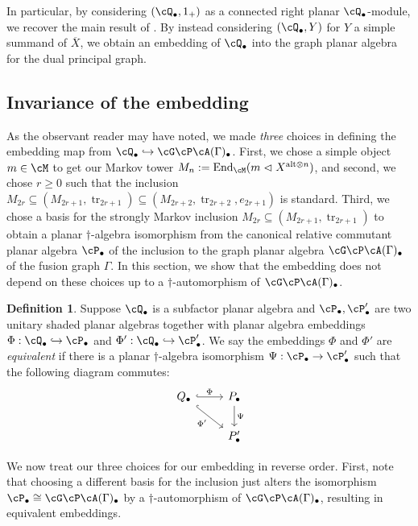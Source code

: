 \documentclass[11pt]{article}
\theoremstyle{plain}
\theoremstyle{definition}
\newtheorem{defn}[thm]{Definition}
\DeclareMathOperator{\End}{End}
\DeclareMathOperator{\tr}{tr}
\begin{document}
In particular, by considering $(\cQ_\bullet,1_+)$ as a connected right planar $\cQ_\bullet$-module, we recover the main result of \cite{MR2812459}. By instead considering $(\cQ_\bullet,Y)$ for $Y$ a simple summand of $\overline{X}$, we obtain an embedding of $\cQ_\bullet$ into the graph planar algebra for the dual principal graph.

\subsection{Invariance of the embedding}
\label{sec:InvarianceOfEmbedding}

As the observant reader may have noted, we made \emph{three} choices in defining the embedding map from $\cQ_\bullet \hookrightarrow\cG\cP\cA(\Gamma)_\bullet$.
First, we chose a simple object $m\in \cM$ to get our Markov tower $M_n := \End_\cM(m \vartriangleleft X^{\text{alt}\otimes n})$, and second, we chose $r\geq 0$ such that the inclusion $M_{2r}\subseteq (M_{2r+1}, \tr_{2r+1})\subseteq (M_{2r+2}, \tr_{2r+2}, e_{2r+1})$ is standard.
Third, we chose a basis for the strongly Markov inclusion $M_{2r}\subseteq (M_{2r+1}, \tr_{2r+1})$ to obtain a planar $\dag$-algebra isomorphism from the canonical relative commutant planar algebra $\cP_\bullet$ of the inclusion to the graph planar algebra $\cG\cP\cA(\Gamma)_\bullet$ of the fusion graph $\Gamma$.
In this section, we show that the embedding does not depend on these choices up to a $\dag$-automorphism of $\cG\cP\cA(\Gamma)_\bullet$.

\begin{defn}
Suppose $\cQ_\bullet$ is a subfactor planar algebra and $\cP_\bullet, \cP_\bullet'$ are two unitary shaded planar algebras together with planar algebra embeddings $\Phi: \cQ_\bullet \hookrightarrow \cP_\bullet$ and $\Phi': \cQ_\bullet \hookrightarrow \cP_\bullet'$.
We say the embeddings $\Phi$ and $\Phi'$ are \emph{equivalent} if there is a planar $\dag$-algebra isomorphism $\Psi: \cP_\bullet \to \cP_\bullet'$ such that the following diagram commutes:
$$
  \begin{tikzcd}
    Q_{\bullet} \arrow[hook]{r}{\Phi} \arrow[swap, hook]{dr}{\Phi'} & P_{\bullet} \arrow{d}{\Psi} 
    \\
     & P_{\bullet}'
  \end{tikzcd}
$$  
\end{defn}


We now treat our three choices for our embedding in reverse order.
First, note that choosing a different basis for the inclusion just alters the isomorphism $\cP_\bullet \cong \cG\cP\cA(\Gamma)_\bullet$ by a $\dag$-automorphism of $\cG\cP\cA(\Gamma)_\bullet$, resulting in equivalent embeddings.
\end{document}

